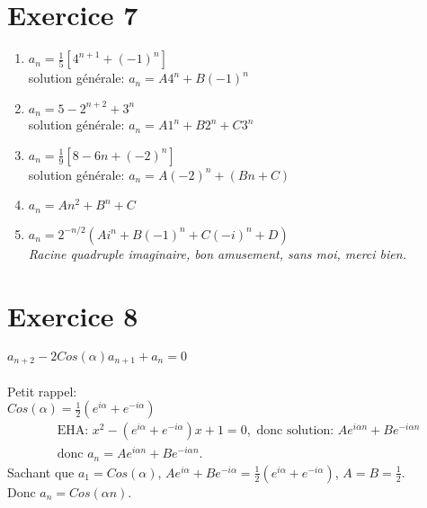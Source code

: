 \documentclass[fontsize=10pt]{article}
\begin{document}
\section*{Exercice 7}
\begin{enumerate}
\item $a_n = \frac{1}{5} \left[4^{n+1} + (-1)^n \right]$\\
solution générale: $a_n = A4^n + B(-1)^n$
\item $a_n = 5 - 2^{n+2} + 3^n$\\
solution générale: $a_n = A1^n + B2^n + C3^n$
\item $a_n = \frac{1}{9} \left[8 - 6n + (-2)^n\right]$\\
solution générale: $a_n = A(-2)^n + (Bn + C)$
\item $a_n = An^2 + B^n + C$
\item $a_n = 2^{-n/2}(Ai^n + B(-1)^n + C(-i)^n + D)$\\
\textit{Racine quadruple imaginaire, bon amusement, sans moi, merci bien.}
\end{enumerate}

\section*{Exercice 8}
$a_{n+2} - 2Cos(\alpha)a_{n+1} + a_n = 0$\\\\
Petit rappel:\\
$Cos(\alpha) = \frac{1}{2}(e^{i\alpha} + e^{-i\alpha})$\\
\begin{align*}
& \text{EHA: } x^2 - (e^{i\alpha} + e^{-i\alpha})x + 1 = 0, \text{ donc solution: } Ae^{i\alpha n} + Be^{-i\alpha n}\\
& \text{donc } a_n = Ae^{i\alpha n} + Be^{-i\alpha n}.
\end{align*}
Sachant que $a_1 = Cos(\alpha)$, $Ae^{i\alpha} + Be^{-i\alpha} = \frac{1}{2}(e^{i\alpha} + e^{-i\alpha})$, $A=B=\frac{1}{2}$.\\
Donc $a_n = Cos(\alpha n)$.
\end{document}
